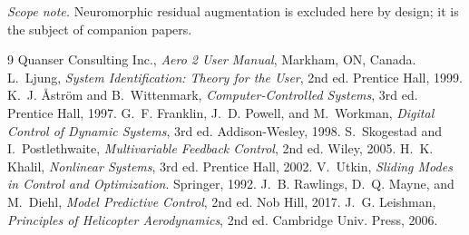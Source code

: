 \documentclass[conference]{IEEEtran}
\begin{document}
\vspace{6pt}
\noindent\textit{Scope note.} Neuromorphic residual augmentation is excluded here by design; it is the subject of companion papers.


\begin{thebibliography}{9}
 Quanser Consulting Inc., \emph{Aero 2 User Manual}, Markham, ON, Canada.
 L.~Ljung, \emph{System Identification: Theory for the User}, 2nd ed. Prentice Hall, 1999.
 K.~J. \AA str\"om and B.~Wittenmark, \emph{Computer-Controlled Systems}, 3rd ed. Prentice Hall, 1997.
 G.~F. Franklin, J.~D. Powell, and M.~Workman, \emph{Digital Control of Dynamic Systems}, 3rd ed. Addison-Wesley, 1998.
 S.~Skogestad and I.~Postlethwaite, \emph{Multivariable Feedback Control}, 2nd ed. Wiley, 2005.
 H.~K. Khalil, \emph{Nonlinear Systems}, 3rd ed. Prentice Hall, 2002.
 V.~Utkin, \emph{Sliding Modes in Control and Optimization}. Springer, 1992.
 J.~B. Rawlings, D.~Q. Mayne, and M.~Diehl, \emph{Model Predictive Control}, 2nd ed. Nob Hill, 2017.
 J.~G. Leishman, \emph{Principles of Helicopter Aerodynamics}, 2nd ed. Cambridge Univ. Press, 2006.
\end{thebibliography}
\end{document}

